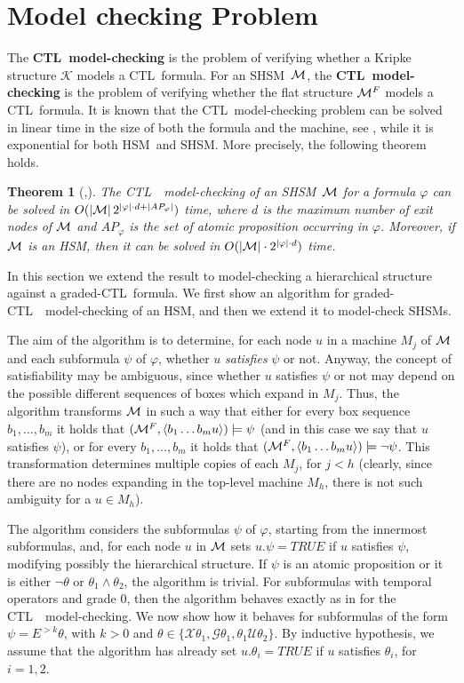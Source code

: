 \documentclass[letterpaper,twocolumn,10pt]{article}
\newtheorem{theorem}{Theorem}
\def    \ctl        {\mbox{\textsc{CTL }\xspace}}
\def    \U          {\mathcal{U}}
\def    \G          {\mathcal{G}}
\def    \M          {{\cal M}}
\def    \X          {\mathcal{X}}
\def    \K          {\mathcal{K}}
\newcommand{\VHSM}{SHSM}
\newcommand{\HSM}{HSM}
\begin{document}
\section{Model checking Problem}\label{sec:Algo}
The \textbf{\ctl model-checking} is the problem of verifying
whether a Kripke structure $\K$ models a \ctl formula.
For an \VHSM\ $\M$,  the \textbf{\ctl model-checking} is the problem of verifying
whether the flat structure $\M^F$ models a \ctl formula.
It is known that the \ctl model-checking problem can be solved in
linear time  in the size of both the formula and  the machine,
see \cite{CE82}, while it is exponential for both  \HSM\ and \VHSM.
More precisely, the following theorem holds.


\begin{theorem}[\cite{AY01},\cite{LNPP08}]\label{theo:ctlMc}
The \ctl\ model-checking  of an \VHSM\ $\M$ for a formula $\varphi$ can be solved in
$O(|\M| \, 2^{|\varphi|\cdot d + |AP_\varphi|})$ time, where $d$ is the maximum number of exit
nodes of $\M$ and $AP_\varphi$ is the set of atomic proposition occurring in $\varphi$. Moreover, if $\M$ is an \HSM, then it can be solved in
$O(|\M| \cdot 2^{|\varphi|\cdot d})$  time.
\end{theorem}



In this section we extend the result to  model-checking a hierarchical structure against a graded-\ctl\-formula.
We first show an algorithm for graded-\ctl\ model-checking  of an \HSM, and then
we  extend it to model-check \VHSM s.

The aim of the algorithm is to determine, for each node $u$ in a machine
$M_j$ of $\M$ and each subformula $\psi$ of $\varphi$, whether  $u$ \emph{satisfies}  $\psi$ or not.
Anyway, the concept of satisfiability  may be  ambiguous, since  whether
 $u$ satisfies  $\psi$ or not  may depend on the possible different sequences of boxes
which expand in $M_j$. Thus, the algorithm transforms $\M$ in such a way that
either  for every  box sequence $b_1,  \dots, b_m $ it holds that
$(\M^F,\langle b_1  \dots  b_m u \rangle) \models \psi $
(and in this case we say that $u$ satisfies $\psi$), or for every  $b_1,  \dots, b_m $ it holds that
$(\M^F,\langle b_1  \dots  b_m u \rangle) \models \neg \psi $.
This transformation determines multiple copies of each  $M_j$, for $j<h$
(clearly, since there are no nodes expanding in the top-level machine $M_h$,   there
is not such ambiguity for a $u\in M_h$).

The algorithm considers the subformulas $\psi$   of $\varphi$, starting from the innermost subformulas, and,
for each node $u$ in $\M$   sets $u.\psi=TRUE$ if $u$ satisfies $\psi$, modifying possibly the hierarchical
structure.
If $\psi$ is an atomic proposition or it is either  $\neg \theta$ or $\theta_1 \wedge \theta_2$, the algorithm is trivial.
For subformulas with temporal operators and grade $0$, then the algorithm behaves exactly as in \cite{AY01} for
the \ctl\ model-checking.
We now show how it behaves for subformulas of the form $\psi=E^{> k} \theta$, with $k > 0$
and  $\theta \in \{  \X \theta_1, \G \theta_1, \theta_1 \U \theta_2 \} $. By inductive hypothesis, we assume that
the algorithm has already set $u.\theta_i=TRUE$ if $u$ satisfies $\theta_i$, for $i=1,2$.
\end{document}
